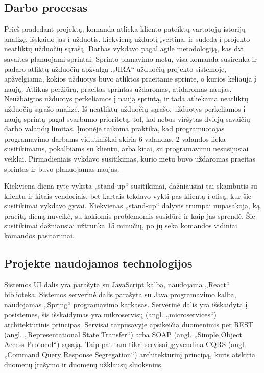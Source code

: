 \subsection{Darbo procesas}
Prieš pradedant projektą, komanda atlieka kliento pateiktų vartotojų istorijų analizę, išskaido jas į užduotis, kiekvieną užduotį įvertina, ir sudeda į projekto neatliktų užduočių sąrašą.
Darbas vykdavo pagal agile metodologiją, kas dvi savaites planuojami sprintai. Sprinto planavimo metu, visa komanda susirenka ir padaro atliktų užduočių apžvalgą „JIRA“
užduočių projekto sistemoje, apžvelgiama, kokios užduotys buvo atliktos praeitame sprinte, o kurios keliauja į naują.
Atlikus peržiūrą, praeitas sprintas uždaromas, atidaromas naujas. Neužbaigtos užduotys perkeliamos į naują sprintą, ir tada atliekama neatliktų užduočių sąrašo analizė.
Iš neatliktų užduočių sąrašo, užduotys perkeliamos į naują sprintą pagal svarbumo prioritetą, tol, kol nebus viršytas dviejų savaičių darbo valandų limitas. Įmonėje taikoma praktika,
kad programuotojas programavimo darbams vidutiniškai skiria 6 valandas, 2 valandos lieka susitikimams, pokalbiams su klientu, arba kitai, su programavimu nesusijusiai veiklai.
Pirmadieniais vykdavo susitikimas, kurio metu buvo uždaromas praeitas sprintas ir buvo planuojamas naujas.

Kiekviena diena ryte vyksta „stand-up“ susitikimai, dažniausiai tai skambutis su klientu ir kitais vendoriais, bet kartais tekdavo vykti pas klientą į ofisą, kur šie
susitikimai vykdavo gyvai. Kiekvienas „stand-up“ dalyvis trumpai nupasakoja, ką praeitą dieną nuveikė, su kokiomis problemomis susidūrė ir kaip jas sprendė.
Šie susitikimai dažniausiai užtrunka 15 minučių, po jų seka komandos vidiniai komandos pasitarimai.




\subsection{Projekte naudojamos technologijos}

Sistemos UI dalis yra parašyta su JavaScript kalba,
naudojama „React“ biblioteka. Sistemos serverinė dalis parašyta su Java programavimo kalba, naudojamas „Spring“ programavimo karkasas. Serverinė dalis yra išskaidyta į
posistemes, šis išskaidymas yra mikroservisų (angl. „microservices“) architektūrinis principas. Servisai tarpusavyje apsikeičia duomenimis per
REST (angl. „Representational State Transfer“) arba SOAP (angl. „Simple Object Access Protocol“) sąsają. Taip pat tam tikri servisai įgyvendina
CQRS (angl. „Command Query Response Segregation“) architektūrinį principą, kuris atskiria duomenų įrašymo ir duomenų užklausų sluoksnius.
